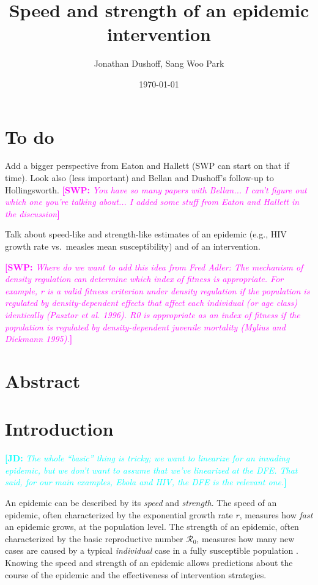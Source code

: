 \documentclass[12pt]{article}
\title{Speed and strength of an epidemic intervention}
\author{Jonathan Dushoff, Sang Woo Park}
\date{\today}
\newcommand{\comment}[3]{\textcolor{#1}{\textbf{[#2: }\textit{#3}\textbf{]}}}
\newcommand{\jd}[1]{\comment{cyan}{JD}{#1}}
\newcommand{\swp}[1]{\comment{magenta}{SWP}{#1}}
\newcommand{\RR}{\ensuremath{{\mathcal R}}}
\begin{document}
\maketitle

\section*{To do}

Add a bigger perspective from Eaton and Hallett (SWP can start on that if time). Look also (less important) and Bellan and Dushoff's follow-up to Hollingsworth. \swp{You have so many papers with Bellan... I can't figure out which one you're talking about... I added some stuff from Eaton and Hallett in the discussion}

Talk about speed-like and strength-like estimates of an epidemic (e.g., HIV growth rate vs.~measles mean susceptibility) and of an intervention.

\swp{Where do we want to add this idea from Fred Adler: The mechanism of density regulation can determine which index of fitness
is appropriate. For example, r is a valid fitness criterion under
density regulation if the population is regulated by density-dependent
effects that affect each individual (or age class) identically (Pasztor
et al. 1996). R0 is appropriate as an index of fitness if the population
is regulated by density-dependent juvenile mortality (Mylius and
Diekmann 1995).}

\section*{Abstract}



\section{Introduction}

\jd{The whole ``basic'' thing is tricky; we want to linearize for an invading epidemic, but we don't want to assume that we've linearized at the DFE. That said, for our main examples, Ebola and HIV, the DFE is the relevant one.}

An epidemic can be described by its \emph{speed} and \emph{strength}.
The speed of an epidemic, often characterized by the exponential growth rate $r$, measures how \emph{fast} an epidemic grows, at the population level. 
The strength of an epidemic, often characterized by the basic reproductive number $\RR_0$, measures how many new cases are caused by a typical \emph{individual} case in a fully susceptible population \citep{anderson1991infectious, diekmann1990definition}.
Knowing the speed and strength of an epidemic allows predictions about the course of the epidemic and the effectiveness of intervention strategies.
\end{document}
